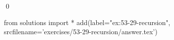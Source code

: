 
\begin{ex}
  \label{ex:53-29-recursion}
  
  \qed
\end{ex}
\begin{python0}
from solutions import *
add(label="ex:53-29-recursion",
    srcfilename='exercises/53-29-recursion/answer.tex')
\end{python0}
